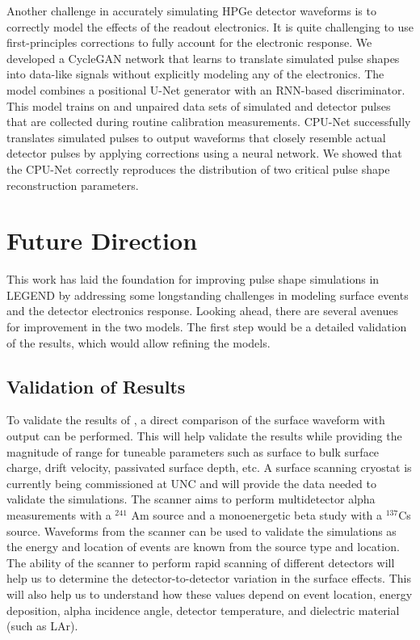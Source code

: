 Another challenge in accurately simulating HPGe detector waveforms is to correctly model the effects of the readout electronics. It is quite challenging to use first-principles corrections to fully account for the electronic response. We developed a CycleGAN network that learns to translate simulated pulse shapes into data-like signals without explicitly modeling any of the electronics. The model combines a positional U-Net generator with an RNN-based discriminator. This model trains on and unpaired data sets of simulated and detector pulses that are collected during routine calibration measurements. CPU-Net successfully translates simulated pulses to output waveforms that closely resemble actual detector pulses by applying corrections using a neural network.  We showed that the CPU-Net correctly reproduces the distribution of two critical pulse shape reconstruction parameters.

\section{Future Direction}
This work has laid the foundation for improving pulse shape simulations in LEGEND by addressing some longstanding challenges in modeling surface events and the detector electronics response. Looking ahead, there are several avenues for improvement in the two models. The first step would be a detailed validation of the results, which would allow refining the models.

\subsection{Validation of Results}
To validate the results of {\ehd}, a direct comparison of the surface waveform with {\ehd} output can be performed. This will help validate the results while providing the magnitude of range for tuneable parameters such as surface to bulk surface charge, drift velocity, passivated surface depth, etc. A surface scanning cryostat is currently being commissioned at UNC and will provide the data needed to validate the simulations. The scanner aims to perform multidetector alpha measurements with a $^{241}$ Am source and a monoenergetic beta study with a $^{137}$Cs source. Waveforms from the scanner can be used to validate the simulations as the energy and location of events are known from the source type and location. The ability of the scanner to perform rapid scanning of different detectors will help us to determine the detector-to-detector variation in the surface effects. This will also help us to understand how these values depend on event location, energy deposition, alpha incidence angle, detector temperature, and dielectric material (such as LAr).


